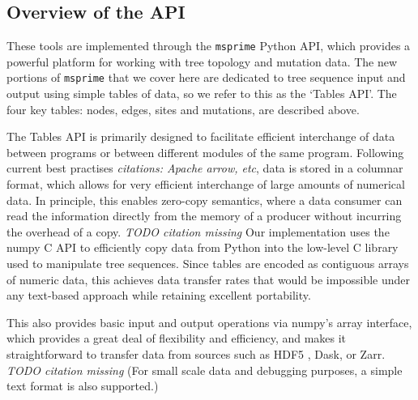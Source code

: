 \documentclass{article}
\newcommand{\msprime}{\texttt{msprime}}
\newcommand{\plr}[1]{{\em \color{blue} #1}}
\newcommand{\jda}[1]{{\em \color{cyan} #1}}
\begin{document}
\subsection*{Overview of the API}

These tools are implemented through the \msprime{} Python API,
which provides a powerful platform for working with tree topology and mutation data.
The new portions of \msprime{} that we cover here
are dedicated to tree sequence input and output using simple tables of data,
so we refer to this as the `Tables API'.
The four key tables: nodes, edges, sites and mutations, are described above.

The Tables API is primarily designed to facilitate efficient interchange of
data between programs or between different modules of the same program.
Following current best practises
\plr{citations: Apache arrow, etc},
data is stored in a columnar format,
which allows for very efficient interchange of large amounts of numerical data.
In principle, this enables zero-copy semantics,
where a data consumer can read the information directly
from the memory of a producer without incurring the overhead of a copy.
\jda{TODO citation missing}
Our implementation uses the numpy C API \citep{numpy_C_api} to efficiently copy
data from Python into the low-level C library used to manipulate tree sequences.
Since tables are encoded as contiguous arrays of numeric data,
this achieves data transfer rates that would be impossible under
any text-based approach while retaining excellent portability.

This also provides basic input and output operations via numpy's
array interface, which provides a great deal of flexibility and efficiency,
and makes it straightforward to transfer data from sources
such as HDF5 \citep{hdf5}, Dask, or Zarr.
\jda{TODO citation missing}
(For small scale data and debugging purposes, a simple text format is also supported.)
\end{document}
